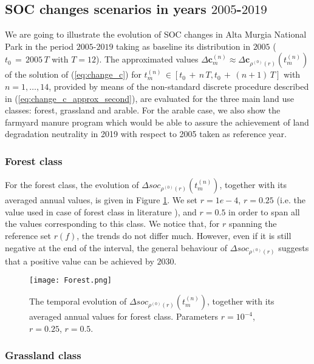 \subsection{SOC changes scenarios in years $2005$-$2019$}
We are going to illustrate the evolution of SOC changes in Alta Murgia National Park in the period $2005$-$2019$ taking as   baseline  its distribution  in $2005$ ($t_0\, =\,2005\, T$ with $T=12$). The  approximated values $\Delta \mathbf{c}_m^{(n)} \approx \Delta \mathbf{c}_{\rho^{(0)}(r)}(t_{m}^{(n)})$ of the solution of (\ref{eq:change_c}) for $t_{m}^{(n)}\, \in [t_0\,+\,n\,T, t_0\,+\, (n+1)\, T]$ with $n=1,\dots, 14$, provided by means of the non-standard discrete procedure described in (\ref{eq:change_c_approx_second}), are evaluated for the three main land use classes: forest, grassland and arable. 
For the arable case, we also show the farmyard manure program which would be able to assure the achievement of land degradation neutrality in 2019 with respect to 2005 taken as reference year. 

\subsubsection{Forest class}
For the forest class, the evolution of $\Delta soc_{\rho^{(0)}(r)}(t^{(n)}_{m})$, together with its averaged annual values, is given in Figure \ref{fig:forest}. We set $r= 1e-4$, $r=0.25$ (i.e. the value used in case of forest class in literature \cite{coleman1996rothc}), and $r=0.5$ in order to span all the values corresponding to this class. We  notice that,  for $r$ spanning the reference set $r(f)$, the trends do not differ much. However, even if it is still negative at the end of the interval, the general behaviour   of $\Delta soc_{\rho^{(0)}(r)}$ suggests that a positive value can be achieved  by $2030$. 
\begin{figure}[t] 
\begin{center} 
  \texttt{[image: Forest.png]}
  \end{center}
  \caption{The temporal evolution of $\Delta soc_{\rho^{(0)}(r)}(t^{(n)}_{m})$, together with its averaged annual values for forest class. Parameters $r=10^{-4}$, $r=0.25$, $r=0.5$. }\label{fig:forest}
\end{figure}
\subsubsection{Grassland class}


